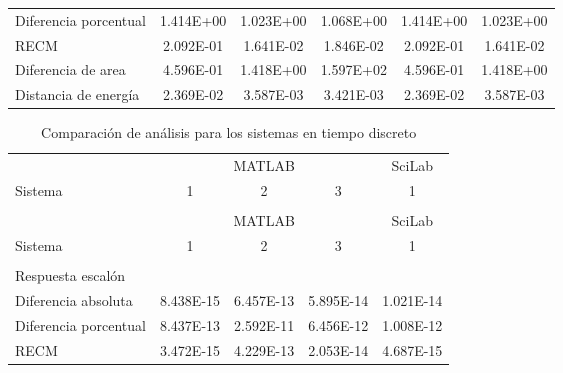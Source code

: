 {\begin{longtable}{l @{\extracolsep{\fill}} ccccc}
            Diferencia porcentual  & \num{1.414E+00} & \num{1.023E+00} & \num{1.068E+00} & \num{1.414E+00} & \num{1.023E+00}  \\
            RECM                   & \num{2.092E-01} & \num{1.641E-02} & \num{1.846E-02} & \num{2.092E-01} & \num{1.641E-02}  \\
            Diferencia de area     & \num{4.596E-01} & \num{1.418E+00} & \num{1.597E+02} & \num{4.596E-01} & \num{1.418E+00}  \\
            Distancia de energía   & \num{2.369E-02} & \num{3.587E-03} & \num{3.421E-03} & \num{2.369E-02} & \num{3.587E-03}  \\
        \end{longtable}}
        
        {\setlength\LTleft{0pt}
        \setlength\LTright{0pt}
        \scriptsize
        \centering
        \renewcommand{\arraystretch}{0.89}
        \begin{longtable}{l @{\extracolsep{\fill}} cccc}
            \caption[Comparación de análisis - tiempo discreto]{Comparación de análisis para los sistemas en tiempo discreto}
            \label{tab:AnalisisStepD} \\
            \toprule
                    & \multicolumn{3}{c}{MATLAB} & SciLab   \\ \cmidrule{2-4}\cmidrule{5-5}
            Sistema &   1     &    2     &    3  &   1      \\ \cmidrule{2-2}\cmidrule{3-3}\cmidrule{4-4}\cmidrule{5-5}
            & & & & \\
            \endfirsthead
            \toprule
                    & \multicolumn{3}{c}{MATLAB} & SciLab   \\ \cmidrule{2-4}\cmidrule{5-5}
            Sistema &   1     &    2     &    3  &   1      \\ \cmidrule{2-2}\cmidrule{3-3}\cmidrule{4-4}\cmidrule{5-5}
            & & & & \\
            \endhead
            \bottomrule
            \endfoot
            Respuesta escalón      & & & & \\ \cmidrule{1-1}
            Diferencia absoluta    & \num{8.438E-15} & \num{6.457E-13} & \num{5.895E-14} & \num{1.021E-14}  \\
            Diferencia porcentual  & \num{8.437E-13} & \num{2.592E-11} & \num{6.456E-12} & \num{1.008E-12}  \\
            RECM                   & \num{3.472E-15} & \num{4.229E-13} & \num{2.053E-14} & \num{4.687E-15}  \\

\end{longtable}}
